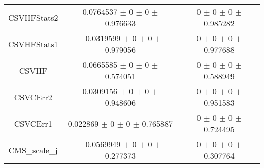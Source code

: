 \begin{table}
\begin{tabular}{ccc}
CSVHFStats2 	& \num{0.0764537} $\pm$ \num{0} $\pm$ \num{0} $\pm$ \num{0.976633} 	& \num{0} $\pm$ \num{0} $\pm$ \num{0} $\pm$ \num{0.985282}\\
CSVHFStats1 	& \num{-0.0319599} $\pm$ \num{0} $\pm$ \num{0} $\pm$ \num{0.979056} 	& \num{0} $\pm$ \num{0} $\pm$ \num{0} $\pm$ \num{0.977688}\\
CSVHF 	& \num{0.0665585} $\pm$ \num{0} $\pm$ \num{0} $\pm$ \num{0.574051} 	& \num{0} $\pm$ \num{0} $\pm$ \num{0} $\pm$ \num{0.588949}\\
CSVCErr2 	& \num{0.0309156} $\pm$ \num{0} $\pm$ \num{0} $\pm$ \num{0.948606} 	& \num{0} $\pm$ \num{0} $\pm$ \num{0} $\pm$ \num{0.951583}\\
CSVCErr1 	& \num{0.022869} $\pm$ \num{0} $\pm$ \num{0} $\pm$ \num{0.765887} 	& \num{0} $\pm$ \num{0} $\pm$ \num{0} $\pm$ \num{0.724495}\\
CMS\_scale\_j 	& \num{-0.0569949} $\pm$ \num{0} $\pm$ \num{0} $\pm$ \num{0.277373} 	& \num{0} $\pm$ \num{0} $\pm$ \num{0} $\pm$ \num{0.307764}\\
\bottomrule
\end{tabular}
\end{table}